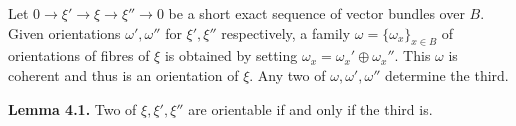 Let $0 \rightarrow \xi' \rightarrow \xi \rightarrow \xi'' \rightarrow 0$ be a short exact sequence of vector bundles over $B$. Given orientations $\omega', \omega''$ for $\xi', \xi''$ respectively, a family $\omega = \{\omega_x\}_{x \in B}$ of orientations of fibres of $\xi$ is obtained by setting $\omega_x = \omega_x' \oplus \omega_x''$. This $\omega$ is coherent and thus is an orientation of $\xi$. Any two of $\omega, \omega', \omega''$ determine the third.

\textbf{Lemma 4.1.} Two of $\xi, \xi', \xi''$ are orientable if and only if the third is.
